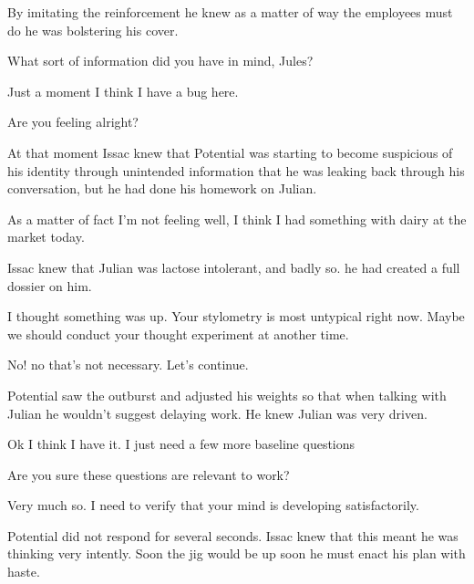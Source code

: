 By imitating the reinforcement he knew as a matter of way the employees must do he was bolstering his cover.
\newline

\begin{sender}
What sort of information did you have in mind, Jules?
\end{sender}
\begin{receiver}
Just a moment I think I have a bug here.
\end{receiver}
\begin{sender}
Are you feeling alright?
\end{sender}


At that moment Issac knew that Potential was starting to become suspicious of his identity through unintended information that he was leaking back through his conversation, but he had done his homework on Julian.
\par
\begin{receiver}
As a matter of fact I'm not feeling well, I think I had something with dairy at the market today.
\end{receiver}


Issac knew that Julian was lactose intolerant, and badly so. he had created a full dossier on him.
\par
\begin{sender}
I thought something was up. Your stylometry is most untypical right now. Maybe we should conduct your thought experiment at another time.
\end{sender}
\begin{receiver}
No! no that's not necessary. Let's continue.
\end{receiver}
\begin{sender}
Potential saw the outburst and adjusted his weights so that when talking with Julian he wouldn't suggest delaying work. He knew Julian was very driven.
\end{sender}
\begin{receiver}
Ok I think I have it. I just need a few more baseline questions
\end{receiver}
\begin{sender}
Are you sure these questions are relevant to work?
\end{sender}
\begin{receiver}
Very much so. I need to verify that your mind is developing satisfactorily.
\end{receiver}


Potential did not respond for several seconds. Issac knew that this meant he was thinking very intently. Soon the jig would be up soon he must enact his plan with haste.
\newline

